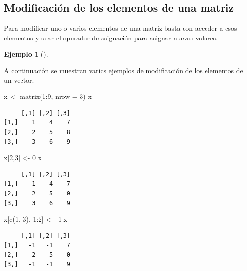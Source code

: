 \documentclass[
  a4paper,
]{scrreport}
\newenvironment{Shaded}{\begin{snugshade}}{\end{snugshade}}
\newcommand{\AttributeTok}[1]{\textcolor[rgb]{0.40,0.45,0.13}{#1}}
\newcommand{\DecValTok}[1]{\textcolor[rgb]{0.68,0.00,0.00}{#1}}
\newcommand{\FunctionTok}[1]{\textcolor[rgb]{0.28,0.35,0.67}{#1}}
\newcommand{\NormalTok}[1]{\textcolor[rgb]{0.00,0.23,0.31}{#1}}
\newcommand{\OtherTok}[1]{\textcolor[rgb]{0.00,0.23,0.31}{#1}}
\newcommand{\SpecialCharTok}[1]{\textcolor[rgb]{0.37,0.37,0.37}{#1}}
\theoremstyle{definition}
\theoremstyle{definition}
\newtheorem{example}{Ejemplo}[chapter]
\theoremstyle{remark}
\begin{document}
\hypertarget{modificaciuxf3n-de-los-elementos-de-una-matriz}{%
\subsection{Modificación de los elementos de una
matriz}\label{modificaciuxf3n-de-los-elementos-de-una-matriz}}

Para modificar uno o varios elementos de una matriz basta con acceder a
esos elementos y usar el operador de asignación para asignar nuevos
valores.

\leavevmode{}%
\begin{example}[]\label{exm-modificacion-matriz}

A continuación se muestran varios ejemplos de modificación de los
elementos de un vector.

\begin{Shaded}
\begin{Highlighting}[]
\NormalTok{x }\OtherTok{\textless{}{-}} \FunctionTok{matrix}\NormalTok{(}\DecValTok{1}\SpecialCharTok{:}\DecValTok{9}\NormalTok{, }\AttributeTok{nrow =} \DecValTok{3}\NormalTok{)}
\NormalTok{x}
\end{Highlighting}
\end{Shaded}

\begin{verbatim}
     [,1] [,2] [,3]
[1,]    1    4    7
[2,]    2    5    8
[3,]    3    6    9
\end{verbatim}

\begin{Shaded}
\begin{Highlighting}[]
\NormalTok{x[}\DecValTok{2}\NormalTok{,}\DecValTok{3}\NormalTok{] }\OtherTok{\textless{}{-}} \DecValTok{0}
\NormalTok{x}
\end{Highlighting}
\end{Shaded}

\begin{verbatim}
     [,1] [,2] [,3]
[1,]    1    4    7
[2,]    2    5    0
[3,]    3    6    9
\end{verbatim}

\begin{Shaded}
\begin{Highlighting}[]
\NormalTok{x[}\FunctionTok{c}\NormalTok{(}\DecValTok{1}\NormalTok{, }\DecValTok{3}\NormalTok{), }\DecValTok{1}\SpecialCharTok{:}\DecValTok{2}\NormalTok{] }\OtherTok{\textless{}{-}} \SpecialCharTok{{-}}\DecValTok{1}
\NormalTok{x}
\end{Highlighting}
\end{Shaded}

\begin{verbatim}
     [,1] [,2] [,3]
[1,]   -1   -1    7
[2,]    2    5    0
[3,]   -1   -1    9
\end{verbatim}

\end{example}
\end{document}
